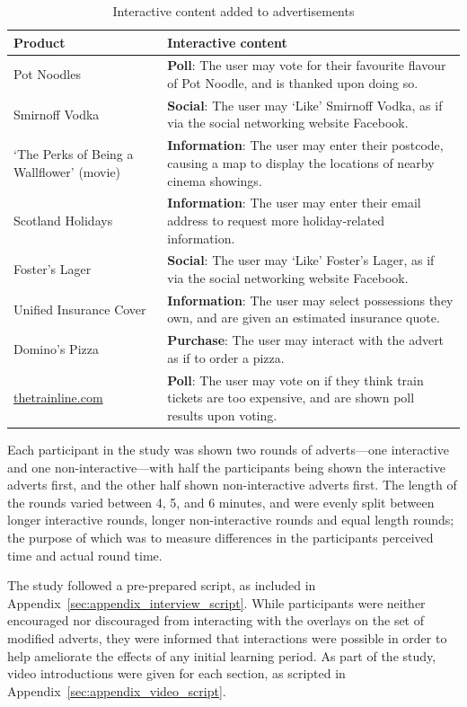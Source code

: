 	\begin{table}[hb]
		\centering
		\begin{tabularx}{\linewidth}{ >{\centering}X X }
			\toprule
			\bf Product & \bf Interactive content \\
			\midrule
			Pot Noodles & \textbf{Poll}: The user may vote for their favourite flavour of Pot Noodle, and is thanked upon doing so. \\
			Smirnoff Vodka & \textbf{Social}: The user may `Like' Smirnoff Vodka, as if via the social networking website Facebook. \\
			`The Perks of Being a Wallflower' (movie) & \textbf{Information}: The user may enter their postcode, causing a map to display the locations of nearby cinema showings. \\
			Scotland Holidays & \textbf{Information}: The user may enter their email address to request more holiday-related information. \\
			Foster's Lager & \textbf{Social}: The user may `Like' Foster's Lager, as if via the social networking website Facebook. \\
			Unified Insurance Cover & \textbf{Information}: The user may select \newline possessions they own, and are given an estimated insurance quote. \\
			Domino's Pizza & \textbf{Purchase}: The user may interact with the advert as if to order a pizza. \\
			\url{thetrainline.com} & \textbf{Poll}: The user may vote on if they think train tickets are too expensive, and are shown poll results upon voting. \\
			\bottomrule
		\end{tabularx}
		\caption{Interactive content added to advertisements}
		\label{tab:interactive_content}
	\end{table}

	Each participant in the study was shown two rounds of adverts---one interactive and one non-interactive---with half the participants being shown the interactive adverts first, and the other half shown non-interactive adverts first. The length of the rounds varied between 4, 5, and 6 minutes, and were evenly split between longer interactive rounds, longer non-interactive rounds and equal length rounds; the purpose of which was to measure differences in the participants perceived time and actual round time. 

	The study followed a pre-prepared script, as included in Appendix~\ref{sec:appendix_interview_script}. While participants were neither encouraged nor discouraged from interacting with the overlays on the set of modified adverts, they were informed that interactions were possible in order to help ameliorate the effects of any initial learning period. As part of the study, video introductions were given for each section, as scripted in Appendix~\ref{sec:appendix_video_script}.

